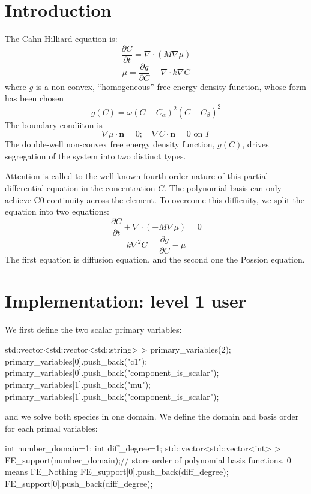 \hypertarget{growth_Introduction}{}\section{Introduction}\label{growth_Introduction}
The Cahn-\/\-Hilliard equation is\-: \[ \frac{\partial C}{\partial t}=\nabla\cdot(M\nabla\mu) \] \[ \mu=\frac{\partial g}{\partial C}-\nabla\cdot k\nabla C \] where $g$ is a non-\/convex, ``homogeneous'' free energy density function, whose form has been chosen \[ g(C)=\omega(C-C_\alpha)^2(C-C_\beta)^2 \] The boundary condiiton is \[ \nabla\mu\cdot\boldsymbol{n}=0;\quad \nabla C\cdot\boldsymbol{n}=0 \text{ on }\Gamma \] The double-\/well non-\/convex free energy density function, $g(C)$, drives segregation of the system into two distinct types.

Attention is called to the well-\/known fourth-\/order nature of this partial differential equation in the concentration $C$. The polynomial basis can only achieve C0 continuity across the element. To overcome this difficuity, we split the equation into two equations\-: \[ \frac{\partial C}{\partial t}+\nabla\cdot(-M\nabla\mu)=0 \] \[ k\nabla^2 C=\frac{\partial g}{\partial C}-\mu \] The first equation is diffusion equation, and the second one the Possion equation. \hypertarget{growth_imple}{}\section{Implementation\-: level 1 user}\label{growth_imple}
We first define the two scalar primary variables\-: 
\begin{DoxyCode}
std::vector<std::vector<std::string> > primary\_variables(2);        
      primary\_variables[0].push\_back(\textcolor{stringliteral}{"c1"}); primary\_variables[0].push\_back(\textcolor{stringliteral}{"component\_is\_scalar"});
      primary\_variables[1].push\_back(\textcolor{stringliteral}{"mu"}); primary\_variables[1].push\_back(\textcolor{stringliteral}{"component\_is\_scalar"});
\end{DoxyCode}
 and we solve both species in one domain. We define the domain and basis order for each primal variables\-: 
\begin{DoxyCode}
\textcolor{keywordtype}{int} number\_domain=1;
\textcolor{keywordtype}{int} diff\_degree=1;
std::vector<std::vector<int> > FE\_support(number\_domain);\textcolor{comment}{// store order of polynomial basis functions, 0
       means FE\_Nothing   }
FE\_support[0].push\_back(diff\_degree);
FE\_support[0].push\_back(diff\_degree);
\end{DoxyCode}
